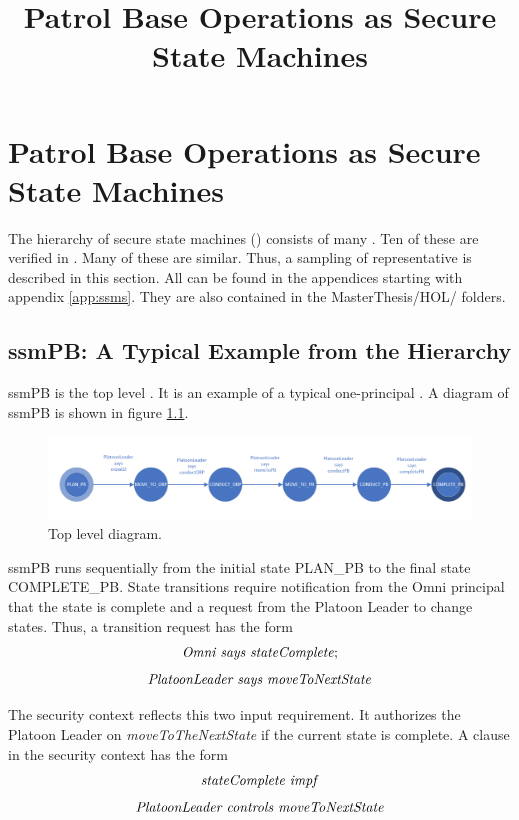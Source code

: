 \documentclass[../../main/main.tex]{subfiles}
\begin{document}
\title{Patrol Base Operations as Secure State Machines}


\chapter{Patrol Base Operations as Secure State Machines} \label{chp:pbssm}
The hierarchy of secure state machines () consists of many .  Ten of these  are verified in .  Many of these  are similar.  Thus, a sampling of representative  is described in this section.  All  can be found in the appendices starting with appendix \ref{app:ssms}.  They are also contained in the MasterThesis/HOL/ folders.

\section{ssmPB: A Typical Example from the Hierarchy}\label{sec:ssmpb}
ssmPB is the top level .  It is an example of a typical one-principal .  A diagram of ssmPB is shown in figure \ref{ssmPBDiagram2}.


\begin{figure}[h!]
\centering
\includegraphics[width=\textwidth]{../figures/ssmPBDiagram}
\caption{\label{ssmPBDiagram2} Top level diagram.}
\end{figure}

ssmPB runs sequentially from the initial state PLAN_PB to the final state COMPLETE_PB.  State transitions require notification from the Omni principal that the state is complete and a request from the Platoon Leader to change states.  Thus, a transition request has the form 
\[\text{\textit{Omni says stateComplete}};\]
\[\text{\textit{PlatoonLeader says moveToNextState}}\]  

The security context reflects this two input requirement.  It authorizes the Platoon Leader on \textit{moveToTheNextState} if the current state is complete. A clause in the security context has the form
\[\text{\textit{stateComplete impf}}\]
\[\text{\textit{PlatoonLeader controls moveToNextState}}\]  
\end{document}
